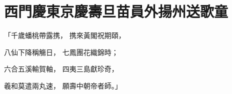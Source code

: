 %

\chapter{西門慶東京慶壽旦\KG 苗員外揚州送歌童}


\begin{showcontents}{}



「千歲蟠桃帶露携，  携來黃閣祝期頤，

八仙下降稱觴日，  七鳳團花織錦時；

六合五溪輸賀軸，  四夷三島獻珍奇，

羲和莫遣兩丸速，  願壽中朝帝者師。」


\end{showcontents}
